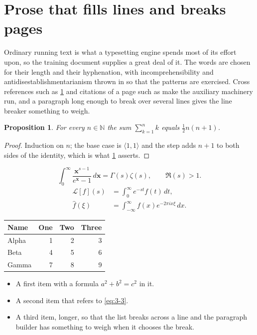\documentclass[11pt,a4paper]{report}
\theoremstyle{plain}
\newtheorem{proposition}{Proposition}[chapter]
\newcommand{\vecn}[1]{\mathbf{#1}}
\newcommand{\pairs}[2]{\langle #1,#2\rangle}
\begin{document}
\section{Prose that fills lines and breaks pages}
\label{sec:prose3-3}
Ordinary running text is what a typesetting engine spends most of its effort
upon, so the training document supplies a great deal of it. The words are
chosen for their length and their hyphenation, with incomprehensibility and
antidisestablishmentarianism thrown in so that the patterns are exercised.
Cross references such as \cref{sec:prose3-3} and citations of a page such
as \pageref{sec:prose3-3} make the auxiliary machinery run, and a
paragraph long enough to break over several lines gives the line breaker
something to weigh.
\begin{proposition}\label{prop:3-3}
For every $n\in\mathbb{N}$ the sum $\sum_{k=1}^{n}k$ equals
$\tfrac{1}{2}n(n+1)$.
\end{proposition}
\begin{proof}
Induction on $n$; the base case is $\pairs{1}{1}$ and the step adds $n+1$ to
both sides of the identity, which is what \cref{prop:3-3} asserts.
\end{proof}
\begin{equation}\label{eq:3-3}
  \int_{0}^{\infty}\frac{\vecn{x}^{s-1}}{e^{\vecn{x}}-1}\,d\vecn{x}
    = \Gamma(s)\zeta(s),\qquad \Re(s)>1 .
\end{equation}
\begin{align}
  \mathcal{L}[f](s) &= \int_{0}^{\infty} e^{-st} f(t)\,dt, \\
  \widehat{f}(\xi)  &= \int_{-\infty}^{\infty} f(x) e^{-2\pi i x\xi}\,dx .
\end{align}
\par\noindent\begin{center}
\begin{tabular}{lrrr}
\hline
Name & One & Two & Three \\
\hline
Alpha & 1 & 2 & 3 \\
Beta & 4 & 5 & 6 \\
Gamma & 7 & 8 & 9 \\
\hline
\end{tabular}
\end{center}
\begin{itemize}
  \item A first item with a formula $a^2+b^2=c^2$ in it.
  \item A second item that refers to \eqref{eq:3-3}.
  \item A third item, longer, so that the list breaks across a line and the
    paragraph builder has something to weigh when it chooses the break.
\end{itemize}
\end{document}
